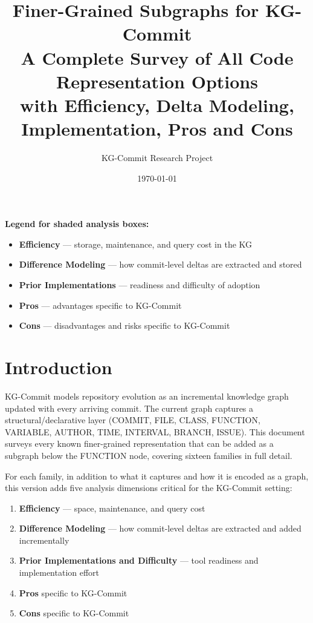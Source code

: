 \documentclass[12pt,a4paper]{article}
\title{\textbf{Finer-Grained Subgraphs for KG-Commit}\\
\large A Complete Survey of All Code Representation Options\\
with Efficiency, Delta Modeling, Implementation, Pros and Cons}
\author{KG-Commit Research Project}
\date{\today}
\begin{document}
\maketitle

\noindent\textbf{Legend for shaded analysis boxes:}
\begin{itemize}[noitemsep,leftmargin=1.5em]
  \item \colorbox{blue!5}{\textbf{Efficiency}} --- storage, maintenance, and query cost in the KG
  \item \colorbox{orange!8}{\textbf{Difference Modeling}} --- how commit-level deltas are extracted and stored
  \item \colorbox{green!6}{\textbf{Prior Implementations}} --- readiness and difficulty of adoption
  \item \colorbox{teal!5}{\textbf{Pros}} --- advantages specific to KG-Commit
  \item \colorbox{red!5}{\textbf{Cons}} --- disadvantages and risks specific to KG-Commit
\end{itemize}

\tableofcontents
\newpage

\section{Introduction}

KG-Commit models repository evolution as an incremental knowledge graph updated
with every arriving commit. The current graph captures a structural/declarative
layer (COMMIT, FILE, CLASS, FUNCTION, VARIABLE, AUTHOR, TIME, INTERVAL, BRANCH,
ISSUE). This document surveys every known finer-grained representation that can
be added as a subgraph below the FUNCTION node, covering sixteen families in
full detail.

For each family, in addition to what it captures and how it is encoded as a
graph, this version adds five analysis dimensions critical for the
KG-Commit setting:

\begin{enumerate}[noitemsep]
  \item \textbf{Efficiency} --- space, maintenance, and query cost
  \item \textbf{Difference Modeling} --- how commit-level deltas are
        extracted and added incrementally
  \item \textbf{Prior Implementations and Difficulty} --- tool readiness
        and implementation effort
  \item \textbf{Pros} specific to KG-Commit
  \item \textbf{Cons} specific to KG-Commit
\end{enumerate}
\end{document}
